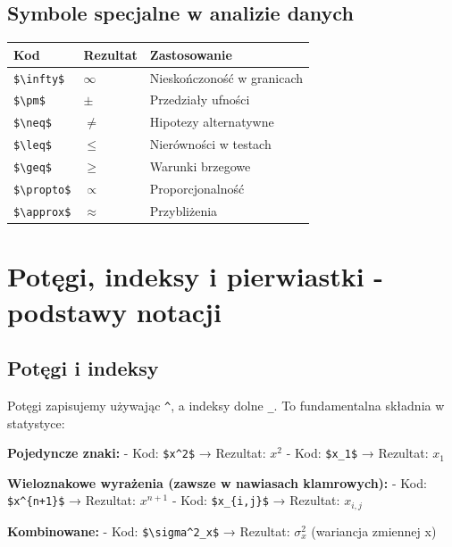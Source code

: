 \documentclass[
  polish,
  letterpaper,
  DIV=11,
  numbers=noendperiod]{scrreprt}
\begin{document}
\subsection{Symbole specjalne w analizie
danych}\label{symbole-specjalne-w-analizie-danych}

\begin{longtable}[]{@{}lll@{}}
\toprule\noalign{}
Kod & Rezultat & Zastosowanie \\
\midrule\noalign{}
\endhead
\bottomrule\noalign{}
\endlastfoot
\texttt{\$\textbackslash{}infty\$} & \(\infty\) & Nieskończoność w
granicach \\
\texttt{\$\textbackslash{}pm\$} & \(\pm\) & Przedziały ufności \\
\texttt{\$\textbackslash{}neq\$} & \(\neq\) & Hipotezy alternatywne \\
\texttt{\$\textbackslash{}leq\$} & \(\leq\) & Nierówności w testach \\
\texttt{\$\textbackslash{}geq\$} & \(\geq\) & Warunki brzegowe \\
\texttt{\$\textbackslash{}propto\$} & \(\propto\) & Proporcjonalność \\
\texttt{\$\textbackslash{}approx\$} & \(\approx\) & Przybliżenia \\
\end{longtable}

\section{Potęgi, indeksy i pierwiastki - podstawy
notacji}\label{potux119gi-indeksy-i-pierwiastki---podstawy-notacji}

\subsection{Potęgi i indeksy}\label{potux119gi-i-indeksy}

Potęgi zapisujemy używając \texttt{\^{}}, a indeksy dolne \texttt{\_}.
To fundamentalna składnia w statystyce:

\textbf{Pojedyncze znaki:} - Kod: \texttt{\$x\^{}2\$} → Rezultat:
\(x^2\) - Kod: \texttt{\$x\_1\$} → Rezultat: \(x_1\)

\textbf{Wieloznakowe wyrażenia (zawsze w nawiasach klamrowych):} - Kod:
\texttt{\$x\^{}\{n+1\}\$} → Rezultat: \(x^{n+1}\) - Kod:
\texttt{\$x\_\{i,j\}\$} → Rezultat: \(x_{i,j}\)

\textbf{Kombinowane:} - Kod: \texttt{\$\textbackslash{}sigma\^{}2\_x\$}
→ Rezultat: \(\sigma^2_x\) (wariancja zmiennej x)
\end{document}
